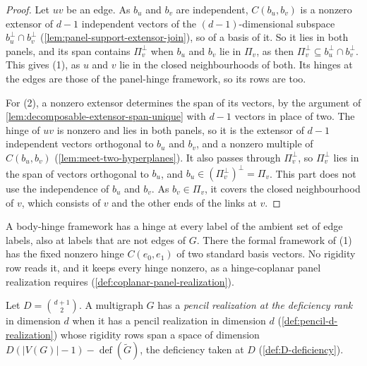 \begin{proof}
  \leanok
  Let $uv$ be an edge. As $b_u$ and $b_v$ are independent, $C(b_u, b_v)$
  is a nonzero extensor of $d - 1$ independent vectors of the
  $(d-1)$-dimensional subspace $b_u^{\perp} \cap b_v^{\perp}$
  (\cref{lem:panel-support-extensor-join}), so of a basis of it. So it
  lies in both panels, and its span contains $\Pi_v^{\perp}$ when $b_u$
  and $b_v$ lie in $\Pi_v$, as then
  $\Pi_v^{\perp} \subseteq b_u^{\perp} \cap b_v^{\perp}$. This gives (1),
  as $u$ and $v$ lie in the closed neighbourhoods of both. Its hinges at
  the edges are those of the panel-hinge framework, so its rows are too.

  For (2), a nonzero extensor determines the span of its vectors, by the
  argument of \cref{lem:decomposable-extensor-span-unique} with $d - 1$
  vectors in place of two. The hinge of $uv$ is nonzero and lies in both
  panels, so it is the extensor of $d - 1$ independent vectors orthogonal
  to $b_u$ and $b_v$, and a nonzero multiple of $C(b_u, b_v)$
  (\cref{lem:meet-two-hyperplanes}). It also passes through
  $\Pi_v^{\perp}$, so $\Pi_v^{\perp}$ lies in the span of vectors
  orthogonal to $b_u$, and
  $b_u \in (\Pi_v^{\perp})^{\perp} = \Pi_v$. This part does not use the
  independence of $b_u$ and $b_v$. As $b_v \in \Pi_v$, it covers the
  closed neighbourhood of $v$, which consists of $v$ and the other ends
  of the links at $v$.
\end{proof}

\begin{fmlnote}
  A body-hinge framework has a hinge at every label of the ambient set
  of edge labels, also at labels that are not edges of $G$. There the
  formal framework of (1) has the fixed nonzero hinge $C(e_0, e_1)$ of
  two standard basis vectors. No rigidity row reads it, and it keeps
  every hinge nonzero, as a hinge-coplanar panel realization requires
  (\cref{def:coplanar-panel-realization}).
\end{fmlnote}

\begin{definition}
  \label{def:pencil-d-rank-hypothesis}
  \leanok
  Let $D = \binom{d+1}{2}$. A multigraph $G$ has a \emph{pencil
  realization at the deficiency rank} in dimension $d$ when it has a
  pencil realization in dimension $d$ (\cref{def:pencil-d-realization})
  whose rigidity rows span a space of dimension
  $D(|V(G)| - 1) - \operatorname{def}(\tilde G)$, the deficiency taken
  at $D$ (\cref{def:D-deficiency}).
\end{definition}

